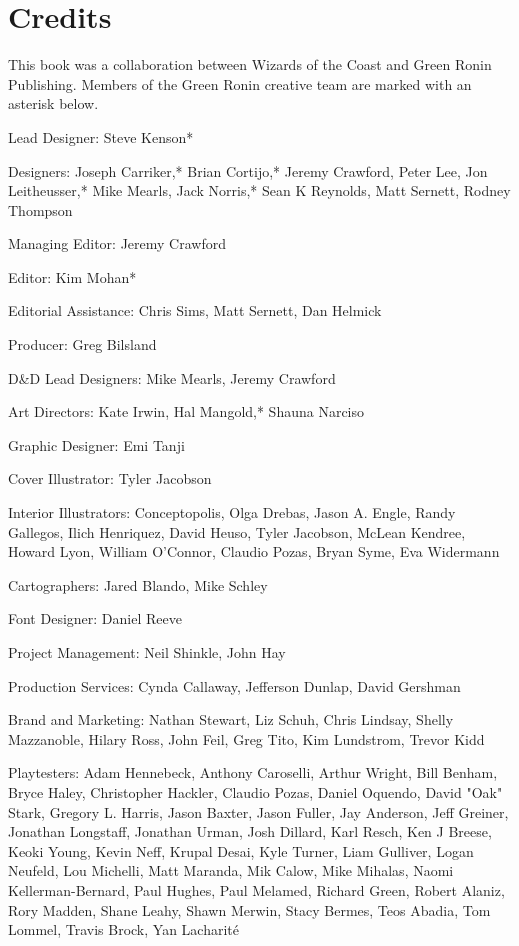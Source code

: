 \documentclass[10pt,a4paper,twoside,twocolumn,openany,bg=print,nodeprecatedcode]{dndbook}
\begin{document}
\chapter{Credits}
This book was a collaboration between Wizards of the Coast and Green Ronin Publishing. Members of the Green Ronin creative team are marked with an asterisk below.

\begin{description}[nolistsep]
\begin{multicols}{2}
\item[Lead Designer:]
Steve Kenson*
\item[Designers:]
Joseph Carriker,* Brian Cortijo,* Jeremy Crawford, Peter Lee, Jon Leitheusser,* Mike Mearls, Jack Norris,* Sean K Reynolds, Matt Sernett, Rodney Thompson
\item[Managing Editor:]
Jeremy Crawford
\item[Editor:]
Kim Mohan*
\item[Editorial Assistance:]
Chris Sims, Matt Sernett, Dan Helmick
\item[Producer:]
Greg Bilsland
\item[D\&D Lead Designers:]
Mike Mearls, Jeremy Crawford
\item[Art Directors:]
Kate Irwin, Hal Mangold,* Shauna Narciso
\item[Graphic Designer:]
Emi Tanji
\item[Cover Illustrator:]
Tyler Jacobson
\item[Interior Illustrators:]
Conceptopolis, Olga Drebas, Jason A. Engle, Randy Gallegos, Ilich Henriquez, David Heuso, Tyler Jacobson, McLean Kendree, Howard Lyon, William O'Connor, Claudio Pozas, Bryan Syme, Eva Widermann
\item[Cartographers:]
Jared Blando, Mike Schley
\item[Font Designer:]
Daniel Reeve
\item[Project Management:]
Neil Shinkle, John Hay
\item[Production Services:]
Cynda Callaway, Jefferson Dunlap, David Gershman
\item[Brand and Marketing:]
Nathan Stewart, Liz Schuh, Chris Lindsay, Shelly Mazzanoble, Hilary Ross, John Feil, Greg Tito, Kim Lundstrom, Trevor Kidd
\item[Playtesters:]
Adam Hennebeck, Anthony Caroselli, Arthur Wright, Bill Benham, Bryce Haley, Christopher Hackler, Claudio Pozas, Daniel Oquendo, David "Oak" Stark, Gregory L. Harris, Jason Baxter, Jason Fuller, Jay Anderson, Jeff Greiner, Jonathan Longstaff, Jonathan Urman, Josh Dillard, Karl Resch, Ken J Breese, Keoki Young, Kevin Neff, Krupal Desai, Kyle Turner, Liam Gulliver, Logan Neufeld, Lou Michelli, Matt Maranda, Mik Calow, Mike Mihalas, Naomi Kellerman-Bernard, Paul Hughes, Paul Melamed, Richard Green, Robert Alaniz, Rory Madden, Shane Leahy, Shawn Merwin, Stacy Bermes, Teos Abadia, Tom Lommel, Travis Brock, Yan Lacharité
\end{multicols}

\end{description}
\end{document}
